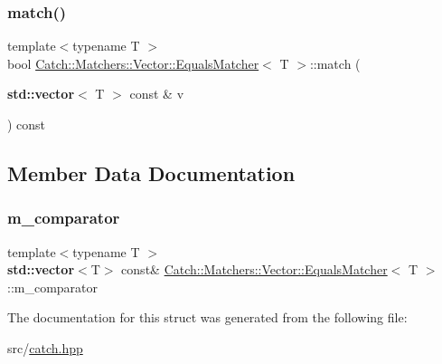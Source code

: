 \mbox{\label{struct_catch_1_1_matchers_1_1_vector_1_1_equals_matcher_aca444c319d1b4c6f538faf9c4735da04}} 
\subsubsection{\texorpdfstring{match()}{match()}}
{\footnotesize\ttfamily template$<$typename T $>$ \\
bool \hyperlink{struct_catch_1_1_matchers_1_1_vector_1_1_equals_matcher}{Catch\+::\+Matchers\+::\+Vector\+::\+Equals\+Matcher}$<$ T $>$\+::match (\begin{DoxyParamCaption}\item[{\textbf{ std\+::vector}$<$ T $>$ const \&}]{v }\end{DoxyParamCaption}) const\hspace{0.3cm}{\ttfamily [inline]}}



\subsection{Member Data Documentation}
\mbox{\label{struct_catch_1_1_matchers_1_1_vector_1_1_equals_matcher_a56f7aa6f110a12b1b9aeb0cabbc9d755}} 
\subsubsection{\texorpdfstring{m\+\_\+comparator}{m\_comparator}}
{\footnotesize\ttfamily template$<$typename T $>$ \\
\textbf{ std\+::vector}$<$T$>$ const\& \hyperlink{struct_catch_1_1_matchers_1_1_vector_1_1_equals_matcher}{Catch\+::\+Matchers\+::\+Vector\+::\+Equals\+Matcher}$<$ T $>$\+::m\+\_\+comparator}



The documentation for this struct was generated from the following file\+:\begin{DoxyCompactItemize}
\item 
src/\hyperlink{catch_8hpp}{catch.\+hpp}\end{DoxyCompactItemize}
